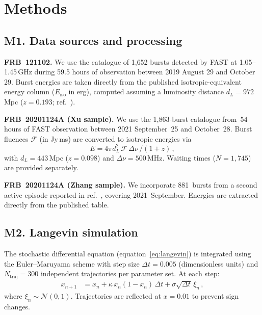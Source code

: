 \documentclass[twocolumn]{article}
\begin{document}
\clearpage

\section*{Methods}

\subsection*{M1. Data sources and processing}

\textbf{FRB~121102.} We use the catalogue of 1{,}652 bursts detected by FAST at 1.05--1.45\,GHz during 59.5 hours of observation between 2019 August 29 and October 29\cite{li2021}. Burst energies are taken directly from the published isotropic-equivalent energy column ($E_{\mathrm{iso}}$ in erg), computed assuming a luminosity distance $d_L = 972$\,Mpc ($z = 0.193$; ref.~\cite{tendulkar2017}).

\textbf{FRB~20201124A (Xu sample).} We use the 1{,}863-burst catalogue from~54 hours of FAST observation between 2021 September~25 and October~28\cite{xu2022}. Burst fluences $\mathcal{F}$ (in Jy\,ms) are converted to isotropic energies via
\begin{equation}
E = 4\pi d_L^2 \,\mathcal{F}\,\Delta\nu\,/(1+z)\,,
\tag{M1}
\label{eq:M1}
\end{equation}
with $d_L = 443$\,Mpc ($z = 0.098$) and $\Delta\nu = 500$\,MHz. Waiting times ($N = 1{,}745$) are provided separately.

\textbf{FRB~20201124A (Zhang sample).} We incorporate 881~bursts from a second active episode reported in ref.~\cite{zhang2022}, covering 2021~September. Energies are extracted directly from the published table.

\subsection*{M2. Langevin simulation}

The stochastic differential equation (equation~\ref{eq:langevin}) is integrated using the Euler--Maruyama scheme with step size $\Delta t = 0.005$ (dimensionless units) and $N_{\mathrm{traj}} = 300$ independent trajectories per parameter set. At each step:
\begin{align}
x_{n+1} &= x_n + \kappa\,x_n(1 - x_n)\,\Delta t + \sigma\sqrt{\Delta t}\,\xi_n\,,
\tag{M2}
\label{eq:M2}
\end{align}
where $\xi_n \sim \mathcal{N}(0,1)$. Trajectories are reflected at $x = 0.01$ to prevent sign changes.
\end{document}
